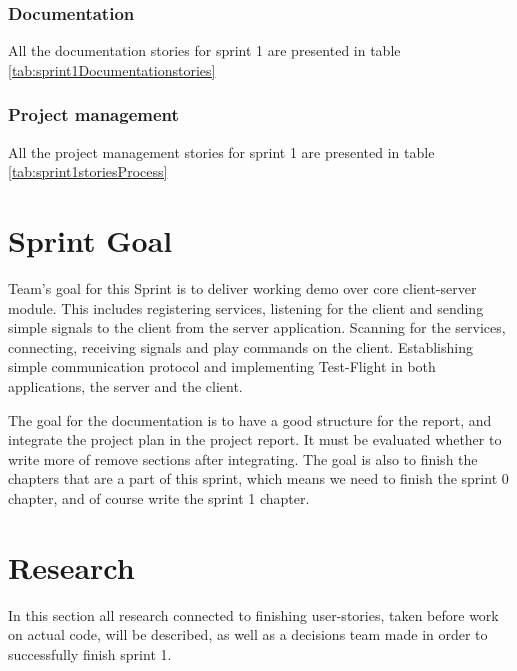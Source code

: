 \subsubsection*{Documentation}
All the documentation stories for sprint 1 are presented in table \ref{tab:sprint1Documentationstories}

\subsubsection*{Project management}
All the project management stories for sprint 1 are presented in table \ref{tab:sprint1storiesProcess}


\section{Sprint Goal}

Team's goal for this Sprint is to deliver working demo over core client-server module.
This includes registering services, listening for the client and sending simple signals to the client from the server application.
Scanning for the services, connecting, receiving signals and play commands on the client.
Establishing simple communication protocol and implementing Test-Flight in both applications, the server and the client.

The goal for the documentation is to have a good structure for the report, and integrate the project plan in the project report. It must be evaluated whether to write more of remove sections after integrating. The goal is also to finish the chapters that are a part of this sprint, which means we need to finish the sprint 0 chapter, and of course write the sprint 1 chapter.

\section {Research}
In this section all research connected to finishing user-stories, taken before work on actual code, will be described, as well as a decisions team made in order to successfully finish sprint 1.

